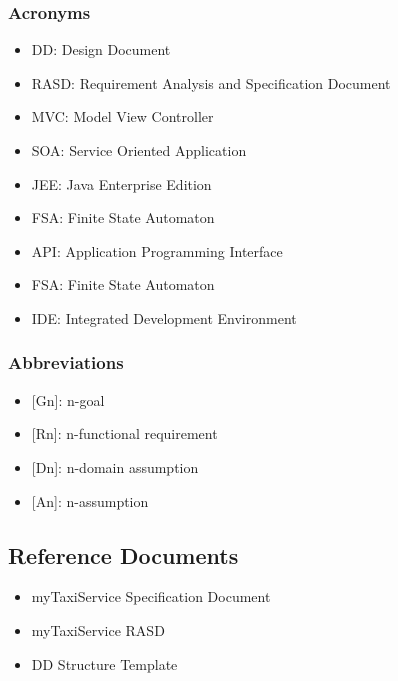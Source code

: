 \subsubsection{Acronyms}
\begin{itemize}
	\item DD: Design Document
	\item RASD: Requirement Analysis and Specification Document
	\item MVC: Model View Controller
	\item SOA: Service Oriented Application
	\item JEE: Java Enterprise Edition
	\item FSA: Finite State Automaton
	\item API: Application Programming Interface
	\item FSA: Finite State Automaton
	\item IDE: Integrated Development Environment
\end{itemize}
\subsubsection{Abbreviations}
\begin{itemize}
\item {[}Gn{]}: n-goal 
\item {[}Rn{]}: n-functional requirement
\item {[}Dn{]}: n-domain assumption
\item {[}An{]}: n-assumption
\end{itemize}
\subsection{Reference Documents}
\begin{itemize}
	\item myTaxiService Specification Document
	\item myTaxiService RASD
	\item DD Structure Template
\end{itemize}

